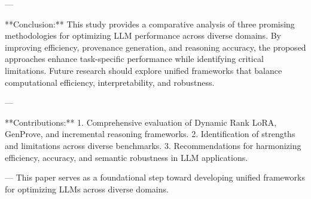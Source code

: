 ---

**Conclusion:**  
This study provides a comparative analysis of three promising methodologies for optimizing LLM performance across diverse domains. By improving efficiency, provenance generation, and reasoning accuracy, the proposed approaches enhance task-specific performance while identifying critical limitations. Future research should explore unified frameworks that balance computational efficiency, interpretability, and robustness.

---

**Contributions:**  
1. Comprehensive evaluation of Dynamic Rank LoRA, GenProve, and incremental reasoning frameworks.
2. Identification of strengths and limitations across diverse benchmarks.
3. Recommendations for harmonizing efficiency, accuracy, and semantic robustness in LLM applications.

---  
This paper serves as a foundational step toward developing unified frameworks for optimizing LLMs across diverse domains.